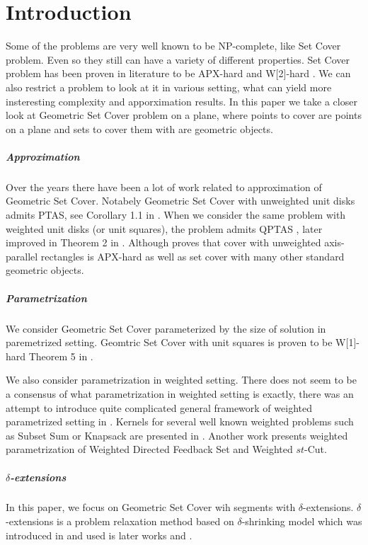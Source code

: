 \chapter{Introduction}

Some of the problems are very well known to be NP-complete, like
Set Cover problem. Even so they still can have a variety
of different properties. Set Cover problem has been proven
in literature to be APX-hard and W[2]-hard \cite{platypus_book}.
We can also restrict a problem to look at it in various setting,
what can yield more insteresting complexity and apporximation results.
In this paper we take a closer look at Geometric Set Cover problem
on a plane, where points to cover are points on a plane
and sets to cover them with are geometric objects.

\paragraph{Approximation}
Over the years there have been a lot of work related to approximation
of Geometric Set Cover. Notabely 
Geometric Set Cover with unweighted unit disks admits PTAS, see
Corollary 1.1 in \cite{unit_disks}. When we consider the same problem
with weighted unit disks (or unit squares), the problem admits QPTAS
\cite{settling_apx_hardness}, later improved in
Theorem 2 in \cite{voronoi_true}.
Although \cite{rectangles_apx_hard} 
proves that cover with unweighted axis-parallel rectangles
is APX-hard as well as set cover with many other
standard geometric objects.

\paragraph{Parametrization}
We consider Geometric Set Cover 
parameterized by the size of solution in paremetrized setting.
Geomtric Set Cover with unit squares is proven to be W[1]-hard 
Theorem 5 in \cite{marx05}.

We also consider parametrization in weighted setting.
There does not seem to be a consensus of what parametrization
in weighted setting is exactly, there
was an attempt to introduce quite complicated general
framework of weighted parametrized setting in \cite{weighted_framework}.
Kernels for several well known weighted problems
such as Subset Sum or Knapsack are presented in \cite{kernel_weighted}.
Another work \cite{weighted_flow} presents weighted
parametrization of Weighted Directed Feedback Set and Weighted $st$-Cut.

\paragraph{$\delta$-extensions}
In this paper, we focus on Geometric Set Cover wih segments with $\delta$-extensions.
$\delta$-extensions is a problem relaxation method based on
$\delta$-shrinking model which was introduced in \cite{shrinking_original}
and used is later works \cite{shrinking1} and \cite{shrinking2}.

